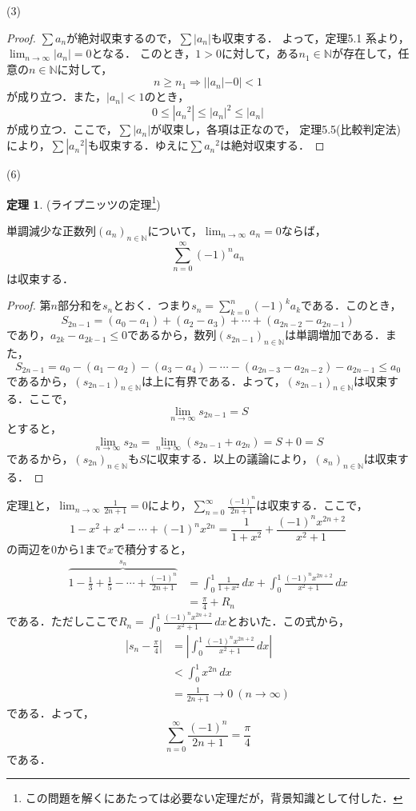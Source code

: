 \documentclass[dvipdfmx,uplatex,11pt]{jsarticle}
\theoremstyle{definition}
\newtheorem{theo}{定理}[section]
\begin{document}
(3)
\begin{leftbar}
	\begin{proof}
		$\sum a_n $が絶対収束するので，$\sum |a_n|$も収束する．
		よって，定理5.1 系より，$\lim_{n \to \infty} |a_n| =0$となる．
		このとき，$1>0$に対して，ある$n_1 \in \mathbb{N}$が存在して，任意の$n \in \mathbb{N}$に対して，
		\[
			n \ge n_1 \Longrightarrow ||a_n| -0|<1
		\]
		が成り立つ．また，$|a_n|<1$のとき，
		\[
			0 \le |{a_n}^2| \le {|a_n|}^2 \le |a_n|
		\]
		が成り立つ．ここで，$\sum |a_n|$が収束し，各項は正なので， 定理5.5(比較判定法)により，$\sum |{a_n}^2|$も収束する．ゆえに$\sum {a_n}^2$は絶対収束する．
	\end{proof}
\end{leftbar}
\newpage
(6)
\begin{theo}(ライプニッツの定理\footnote{この問題を解くにあたっては必要ない定理だが，背景知識として付した．}) \par 
    \label{ライプニッツの定理}
    単調減少な正数列$(a_n)_{n \in \mathbb{N}}$について，$\lim_{n \to \infty} a_n =0$ならば，
    \[
        \sum_{n=0}^{\infty} (-1)^n a_n 
    \]
    は収束する．
\end{theo}
\begin{proof}
    第$n$部分和を$s_n$とおく．つまり$s_n = \sum_{k=0}^{n} (-1)^k a_k$である．このとき，
    \[
        S_{2n-1} = (a_0 -a_1) + (a_2-a_3)+ \cdots +(a_{2n-2}-a_{2n-1})
    \]
    であり，$ a_{2k}-a_{2k-1} \le 0$であるから，数列$(s_{2n-1})_{n \in \mathbb{N}}$は単調増加である．また，
    \[
        S_{2n-1} = a_0 -(a_1- a_2)-(a_3-a_4)- \cdots -(a_{2n-3}-a_{2n-2})-a_{2n-1} \le a_{0}
    \]
    であるから，$(s_{2n-1})_{n \in \mathbb{N}}$は上に有界である．よって，$(s_{2n-1})_{n \in \mathbb{N}}$は収束する．ここで，
    \[
        \lim_{n \to \infty} s_{2n-1} =S
    \]
    とすると，
    \[
        \lim_{n \to \infty} s_{2n} =\lim_{n \to \infty} (s_{2n-1}+a_{2n})=S+0=S
    \]
    であるから，$(s_{2n})_{n \in \mathbb{N}}$も$S$に収束する．以上の議論により，$(s_n)_{n \in \mathbb{N}}$は収束する．
\end{proof}
\begin{leftbar}
    定理\ref{ライプニッツの定理}と，$\lim_{n \to \infty} \frac{1}{2n+1} =0$により，$\sum_{n=0}^{\infty} \frac{(-1)^n}{2n+1}$は収束する．ここで，
    \[
         1-x^2+x^4-\cdots+(-1)^n x^{2n} =\frac{1}{1+x^2} +\frac{(-1)^n x^{2n+2}}{x^2+1}
    \]
の両辺を0から1まで$x$で積分すると，
\begin{align*}
   \overbrace{1-\frac{1}{3}+\frac{1}{5}-\cdots+\frac{(-1)^n}{2n+1}}^{s_n} &=\int_{0}^{1} \frac{1}{1+x^2} \, dx +\int_{0}^{1}\frac{(-1)^n x^{2n+2}}{x^2+1}  \, dx \\
& = \frac{\pi}{4} + R_n
\end{align*}
である．ただしここで$R_n =\int_{0}^{1}\frac{(-1)^n x^{2n+2}}{x^2+1} \, dx$とおいた．この式から，
\begin{align*}
   \left |s_n -\frac{\pi}{4} \right | & = \left|\int_{0}^{1}\frac{(-1)^n x^{2n+2}}{x^2+1} \, dx \right| \\
   & < \int_{0}^{1} x^{2n} \, dx \\
   & =\frac{1}{2n+1} \to 0 ~(n \to \infty)
\end{align*}
である．よって，
\[
    \sum_{n=0}^{\infty} \frac{(-1)^n}{2n+1} =\frac{\pi}{4}
\]
である．
\end{leftbar}
\newpage
\end{document}
